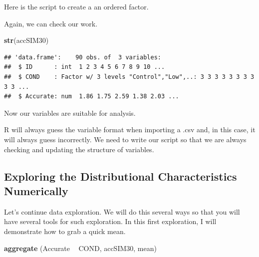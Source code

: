 \documentclass[
  english,
]{book}
\newenvironment{Shaded}{\begin{snugshade}}{\end{snugshade}}
\newcommand{\DataTypeTok}[1]{\textcolor[rgb]{0.13,0.29,0.53}{#1}}
\newcommand{\KeywordTok}[1]{\textcolor[rgb]{0.13,0.29,0.53}{\textbf{#1}}}
\newcommand{\NormalTok}[1]{#1}
\newcommand{\OperatorTok}[1]{\textcolor[rgb]{0.81,0.36,0.00}{\textbf{#1}}}
\newcommand{\StringTok}[1]{\textcolor[rgb]{0.31,0.60,0.02}{#1}}
\begin{document}
Here is the script to create a an ordered factor.

\begin{Shaded}
\end{Shaded}

Again, we can check our work.

\begin{Shaded}
\begin{Highlighting}[]
\KeywordTok{str}\NormalTok{(accSIM30)}
\end{Highlighting}
\end{Shaded}

\begin{verbatim}
## 'data.frame':    90 obs. of  3 variables:
##  $ ID      : int  1 2 3 4 5 6 7 8 9 10 ...
##  $ COND    : Factor w/ 3 levels "Control","Low",..: 3 3 3 3 3 3 3 3 3 3 ...
##  $ Accurate: num  1.86 1.75 2.59 1.38 2.03 ...
\end{verbatim}

Now our variables are suitable for analysis.

R will always guess the variable format when importing a .csv and, in this case, it will always guess incorrectly. We need to write our script so that we are always checking and updating the structure of variables.

\hypertarget{exploring-the-distributional-characteristics-numerically}{%
\subsection{Exploring the Distributional Characteristics Numerically}\label{exploring-the-distributional-characteristics-numerically}}

Let's continue data exploration. We will do this several ways so that you will have several tools for such exploration. In this first exploration, I will demonstrate how to grab a quick mean.

\begin{Shaded}
\begin{Highlighting}[]
\KeywordTok{aggregate}\NormalTok{ (Accurate }\OperatorTok{~}\StringTok{ }\NormalTok{COND, accSIM30, mean)}
\end{Highlighting}
\end{Shaded}
\end{document}
